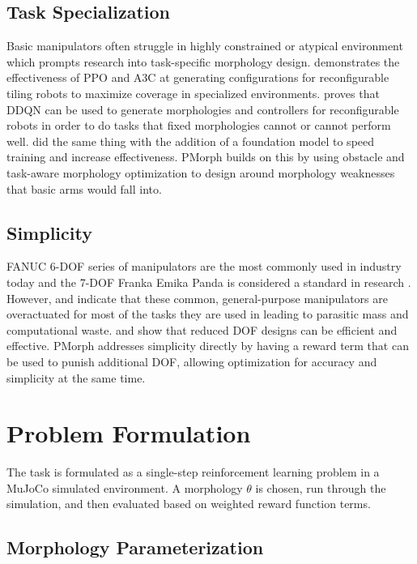 \documentclass[defaultstyle,11pt]{thesis}
\begin{document}
\subsection{Task Specialization}
Basic manipulators often struggle in highly constrained or atypical environment which prompts research into task-specific morphology design.
\cite{kalimuthu2023} demonstrates the effectiveness of PPO and A3C at generating configurations for reconfigurable tiling robots to maximize coverage in specialized environments.
\cite{ding2024modular} proves that DDQN can be used to generate morphologies and controllers for reconfigurable robots in order to do tasks that fixed morphologies cannot or cannot perform well.
\cite{spielberg2025accelerated} did the same thing with the addition of a foundation model to speed training and increase effectiveness.
PMorph builds on this by using obstacle and task-aware morphology optimization to design around morphology weaknesses that basic arms would fall into.

\subsection{Simplicity}
FANUC 6-DOF series of manipulators are the most commonly used in industry today \cite{patentpc2025toprobotics}\cite{standardbots2025fanucprice} and the 7-DOF Franka Emika Panda is considered a standard in research \cite{haddadin2022franka}\cite{oliva2022franksim}.
However, \cite{russo2021task} and \cite{he2019underactuated} indicate that these common, general-purpose manipulators are overactuated for most of the tasks they are used in leading to parasitic mass and computational waste.
\cite{fasquell2020bioinspired} and \cite{nakano2023robostrich} show that reduced DOF designs can be efficient and effective.
PMorph addresses simplicity directly by having a reward term that can be used to punish additional DOF, allowing optimization for accuracy and simplicity at the same time.

\section{Problem Formulation}
\label{sec:problem}

The task is formulated as a single-step reinforcement learning problem in a MuJoCo simulated environment.
A morphology $\theta$ is chosen, run through the simulation, and then evaluated based on weighted reward function terms.

\subsection{Morphology Parameterization}
\end{document}
